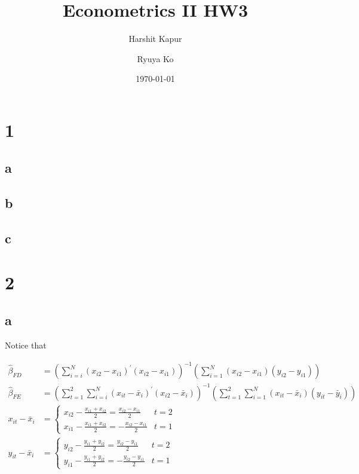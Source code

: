 \documentclass[11pt]{article}
\begin{document}
\title{Econometrics II HW3} %
\author[1]{Harshit Kapur}
\author[2]{Ryuya Ko}
\date{\today}

\maketitle

\pagebreak

\section*{1}

\subsection*{a}

\subsection*{b}

\subsection*{c}
\section*{2}
\subsection*{a}

Notice that

\begin{align*}
    \hat{\beta}_{FD}
    &= \left( \sum_{i=i}^{N} (x_{i2} - x_{i1})^\prime (x_{i2} - x_{i1}) \right)^{-1} \left( \sum_{i=1}^{N} (x_{i2} - x_{i1}) (y_{i2} - y_{i1}) \right) \\
    \hat{\beta}_{FE}
    &= \left( \sum_{t=1}^{2}\sum_{i=i}^{N} (x_{it} - \bar{x}_{i})^\prime (x_{i2} - \bar{x}_{i}) \right)^{-1} \left( \sum_{t=1}^{2}\sum_{i=1}^{N} (x_{it} - \bar{x}_i) (y_{it} - \bar{y}_{i}) \right) \\
    x_{it} - \bar{x}_i
    &= \begin{cases}{}
        x_{i2} - \frac{x_{i1} + x_{i2}}{2} = \frac{x_{i2} - x_{i1}}{2} & t = 2\\
        x_{i1} - \frac{x_{i1} + x_{i2}}{2} = - \frac{x_{i2} - x_{i1}}{2} & t = 1
    \end{cases} \\
    y_{it} - \bar{x}_i
    &= \begin{cases}{}
        y_{i2} - \frac{y_{i1} + y_{i2}}{2} = \frac{y_{i2} - y_{i1}}{2} & t = 2\\
        y_{i1} - \frac{y_{i1} + y_{i2}}{2} = - \frac{y_{i2} - y_{i1}}{2} & t = 1
    \end{cases}
\end{align*}
\end{document}
